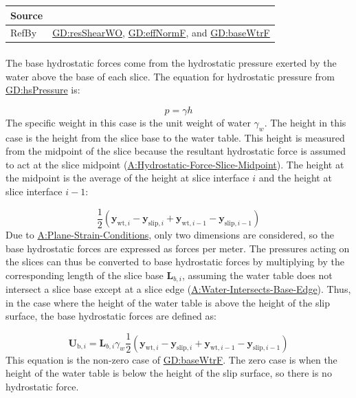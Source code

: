 \documentclass[12pt]{article}
\begin{document}
\begin{minipage}{\textwidth}
\begin{tabular}{>{\raggedright}p{}>{\raggedright\arraybackslash}p{}}
\\ \midrule
Source & \cite{fredlund1977}
         
\\ \midrule
RefBy & \hyperref[GD:resShearWO]{GD:resShearWO}, \hyperref[GD:effNormF]{GD:effNormF}, and \hyperref[GD:baseWtrF]{GD:baseWtrF}
        
\\ \bottomrule
\end{tabular}
\end{minipage}

\paragraph{}
\label{GD:baseWtrFDeriv}
The base hydrostatic forces come from the hydrostatic pressure exerted by the water above the base of each slice. The equation for hydrostatic pressure from \hyperref[GD:hsPressure]{GD:hsPressure} is:

\begin{displaymath}
p=γ h
\end{displaymath}
The specific weight in this case is the unit weight of water ${γ_{w}}$. The height in this case is the height from the slice base to the water table. This height is measured from the midpoint of the slice because the resultant hydrostatic force is assumed to act at the slice midpoint (\hyperref[assumpHFSM]{A:Hydrostatic-Force-Slice-Midpoint}). The height at the midpoint is the average of the height at slice interface $i$ and the height at slice interface $i-1$:

\begin{displaymath}
\frac{1}{2} \left({\symbf{y}_{\text{wt},i}}-{\symbf{y}_{\text{slip},i}}+{\symbf{y}_{\text{wt},i-1}}-{\symbf{y}_{\text{slip},i-1}}\right)
\end{displaymath}
Due to \hyperref[assumpPSC]{A:Plane-Strain-Conditions}, only two dimensions are considered, so the base hydrostatic forces are expressed as forces per meter. The pressures acting on the slices can thus be converted to base hydrostatic forces by multiplying by the corresponding length of the slice base ${\symbf{L}_{b,i}}$, assuming the water table does not intersect a slice base except at a slice edge (\hyperref[assumpWIBE]{A:Water-Intersects-Base-Edge}). Thus, in the case where the height of the water table is above the height of the slip surface, the base hydrostatic forces are defined as:

\begin{displaymath}
{\symbf{U}_{\text{b},i}}={\symbf{L}_{b,i}} {γ_{w}} \frac{1}{2} \left({\symbf{y}_{\text{wt},i}}-{\symbf{y}_{\text{slip},i}}+{\symbf{y}_{\text{wt},i-1}}-{\symbf{y}_{\text{slip},i-1}}\right)
\end{displaymath}
This equation is the non-zero case of \hyperref[GD:baseWtrF]{GD:baseWtrF}. The zero case is when the height of the water table is below the height of the slip surface, so there is no hydrostatic force.
\end{document}
